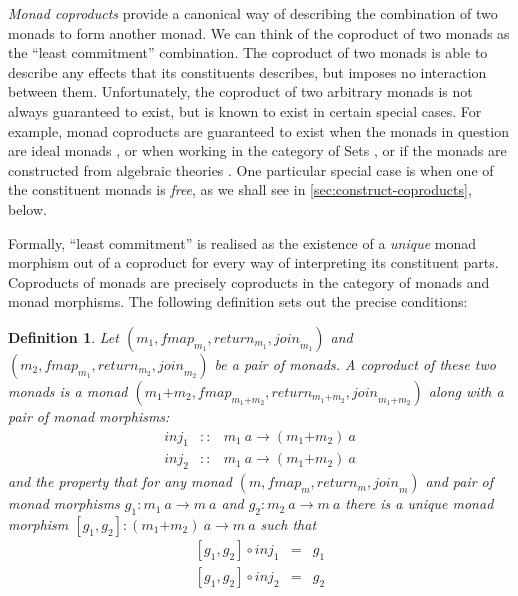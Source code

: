 \documentclass{jfp1}
\newtheorem{definition}{Definition}
\begin{document}
\newcommand{\cprd}[2]{#1\mathord{+}#2}

\emph{Monad coproducts} provide a canonical way of describing the
combination of two monads to form another monad. We can think of the
coproduct of two monads as the ``least commitment'' combination. The
coproduct of two monads is able to describe any effects that its
constituents describes, but imposes no interaction between
them. Unfortunately, the coproduct of two arbitrary monads is not
always guaranteed to exist, but is known to exist in certain special
cases. For example, monad coproducts are guaranteed to exist when the
monads in question are ideal monads \cite{ghani04coproducts}, or when
working in the category of Sets \cite{adamek12coproducts}, or if the
monads are constructed from algebraic theories
\cite{hyland06combining}. One particular special case is when one of
the constituent monads is \emph{free}, as we shall see in
\autoref{sec:construct-coproducts}, below.

Formally, ``least commitment'' is realised as the existence of a
\emph{unique} monad morphism out of a coproduct for every way of
interpreting its constituent parts. Coproducts of monads are precisely
coproducts in the category of monads and monad morphisms. The
following definition sets out the precise conditions:
\begin{definition}\label{defn:coproducts}
  Let $(m_1, \mathit{fmap}_{m_1}, \mathit{return}_{m_1}, \mathit{join}_{m_1})$ and $(m_2,
  \mathit{fmap}_{m_1}, \mathit{return}_{m_2}, \mathit{join}_{m_2})$ be a pair of monads. A \emph{coproduct} of these two monads is a
  monad $(\cprd{m_1}{m_2}, \mathit{fmap}_{\cprd{m_1}{m_2}}, \mathit{return}_{\cprd{m_1}{m_2}},
  \mathit{join}_{\cprd{m_1}{m_2}})$ along with a pair of monad morphisms:
  \begin{displaymath}
    \begin{array}{rcl}
      \mathit{inj}_1 & :: & m_1~a \to (\cprd{m_1}{m_2})~a \\
      \mathit{inj}_2 & :: & m_1~a \to (\cprd{m_1}{m_2})~a
    \end{array}
  \end{displaymath}
  and the property that for any monad $(m,\mathit{fmap}_m,
  \mathit{return}_m, \mathit{join}_m)$ and pair of monad morphisms
  $g_1 : m_1~a \to m~a$ and $g_2 : m_2~a \to m~a$ there is a
  \emph{unique} monad morphism $[g_1,g_2] : (\cprd{m_1}{m_2})~a \to
  m~a$ such that
  \begin{displaymath}
    \begin{array}{rcl}
      {}[g_1,g_2] \circ \mathit{inj}_1 & = & g_1 \\
      {}[g_1,g_2] \circ \mathit{inj}_2 & = & g_2
    \end{array}
  \end{displaymath}
\end{definition}
\end{document}
